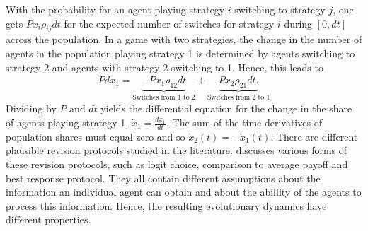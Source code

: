 With the probability for an agent playing strategy $i$ switching to strategy
$j$, one gets $P x_i \rho_{ij} dt$ for the expected number of 
switches for strategy $i$ during $[0,dt]$ across the population.   
In a game with two strategies, the change in the number 
of agents in the population playing strategy 1 is determined 
by agents switching to strategy 2 and agents with strategy 2 
switching to 1. Hence, this leads to
\begin{align} 
        Pdx_1 =  \underbrace{-Px_1 \rho_{12}dt}_{\text{Switches from 1 to 2}} 
        + \underbrace{Px_2 \rho_{21}dt.}_{\text{Switches from 2 to 1}}
\end{align}
Dividing by $P$ and $dt$ yields the differential equation for
the change in the share of agents playing strategy 1, 
$\dot{x}_1 =\frac{dx_1}{dt}$. 
The sum of the time derivatives of population shares must equal zero and so
$\dot{x}_2(t) =- \dot{x}_1(t)$.
There are different plausible revision protocols studied in the literature. 
\textcite{sandholm_population_2010} discusses various forms of 
these revision protocols, such as logit choice, comparison to average payoff 
and best response protocol. 
They all contain different assumptions about the information 
an individual agent can obtain and about the abillity of the agents 
to process this information. Hence, the resulting evolutionary 
dynamics have different properties.

